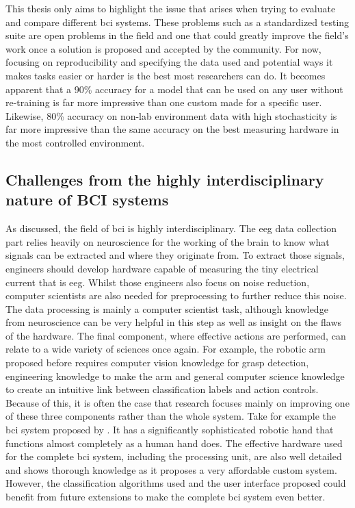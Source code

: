 This thesis only aims to highlight the issue that arises when trying to evaluate and compare different \gls{bci} systems.
These problems such as a standardized testing suite are open problems in the field and one that could greatly improve the field's work once a solution is proposed and accepted by the community.
For now, focusing on reproducibility and specifying the data used and potential ways it makes tasks easier or harder is the best most researchers can do.
It becomes apparent that a 90\% accuracy for a model that can be used on any user without re-training is far more impressive than one custom made for a specific user.
Likewise, 80\% accuracy on non-lab environment data with high stochasticity is far more impressive than the same accuracy on the best measuring hardware in the most controlled environment. 


\subsection{Challenges from the highly interdisciplinary nature of BCI systems}
\label{subsec:bci_opportunities_obstacles_interdisciplinary}



\lipsum[1-3]

As discussed, the field of \gls{bci} is highly interdisciplinary.
The \gls{eeg} data collection part relies heavily on neuroscience for the working of the brain to know what signals can be extracted and where they originate from.
To extract those signals, engineers should develop hardware capable of measuring the tiny electrical current that is \gls{eeg}.
Whilst those engineers also focus on noise reduction, computer scientists are also needed for preprocessing to further reduce this noise.
The data processing is mainly a computer scientist task, although knowledge from neuroscience can be very helpful in this step as well as insight on the flaws of the hardware.
The final component, where effective actions are performed, can relate to a wide variety of sciences once again.
For example, the robotic arm proposed before requires computer vision knowledge for grasp detection, engineering knowledge to make the arm and general computer science knowledge to create an intuitive link between classification labels and action controls.
Because of this, it is often the case that research focuses mainly on improving one of these three components rather than the whole system.
Take for example the \gls{bci} system proposed by \citet{complex_hand_few_classes}.
It has a significantly sophisticated robotic hand that functions almost completely as a human hand does.
The effective hardware used for the complete \gls{bci} system, including the processing unit, are also well detailed and shows thorough knowledge as it proposes a very affordable custom system.
However, the classification algorithms used and the user interface proposed could benefit from future extensions to make the complete \gls{bci} system even better.

